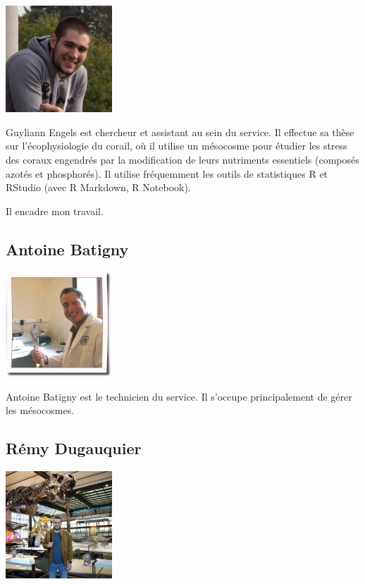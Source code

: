 \documentclass[]{report}
\begin{document}
\includegraphics[width=4.00000cm]{../image/Guyliann.jpg}

Guyliann Engels est chercheur et assistant au sein du service. Il
effectue sa thèse sur l'écophysiologie du corail, où il utilise un
mésocosme pour étudier les stress des coraux engendrés par la
modification de leurs nutriments essentiels (composés azotés et
phosphorés). Il utilise fréquemment les outils de statistiques R et
RStudio (avec R Markdown, R Notebook).

Il encadre mon travail.

\subsection{Antoine Batigny}\label{antoine-batigny}

\includegraphics[width=4.00000cm]{../image/antoine2.jpg}

Antoine Batigny est le technicien du service. Il s'occupe principalement
de gérer les mésocosmes.

\subsection{Rémy Dugauquier}\label{remy-dugauquier}

\includegraphics[width=4.00000cm]{../image/remy.jpg}
\end{document}
